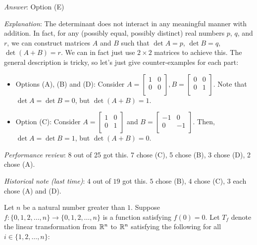 \documentclass[10pt]{amsart}
\begin{document}
\begin{enumerate}
  {\em Answer}: Option (E)

  {\em Explanation}: The determinant does not interact in any
  meaningful manner with addition. In fact, for any (possibly equal,
  possibly distinct) real numbers $p$, $q$, and $r$, we can construct
  matrices $A$ and $B$ such that $\det A = p$, $\det B = q$, $\det (A
  + B) = r$. We can in fact just use $2 \times 2$ matrices to achieve
  this. The general description is tricky, so let's just give
  counter-examples for each part:

  \begin{itemize}
  \item Options (A), (B) and (D): Consider $A = \left[\begin{matrix} 1 & 0
      \\ 0 & 0 \\\end{matrix}\right], B = \left[\begin{matrix} 0 & 0
      \\ 0 & 1 \\\end{matrix}\right]$. Note that $\det A = \det B =
    0$, but $\det(A + B) = 1$.
  \item Option (C): Consider $A = \left[\begin{matrix} 1 & 0 \\ 0 & 1
      \\\end{matrix}\right]$ and $B = \left[\begin{matrix} -1 & 0 \\ 0
      & -1 \\\end{matrix}\right]$. Then, $\det A = \det B = 1$, but
    $\det(A + B) = 0$.
  \end{itemize}

  {\em Performance review}: 8 out of 25 got this. 7 chose (C), 5 chose
  (B), 3 chose (D), 2 chose (A).

  {\em Historical note (last time)}: $4$ out of $19$ got this. $5$ chose (B),
  $4$ chose (C), $3$ each chose (A) and (D).

  \vspace{0.6in}

  Let $n$ be a natural number greater than $1$. Suppose $f: \{
  0,1,2,\dots,n\} \to \{ 0,1,2,\dots,n\}$ is a function satisfying $f(0)
  = 0$. Let $T_f$ denote the linear transformation from $\mathbb{R}^n$ to $\mathbb{R}^n$
  satisfying the following for all $i \in \{ 1,2,\dots,n\}$:
  

\end{enumerate}
\end{document}
